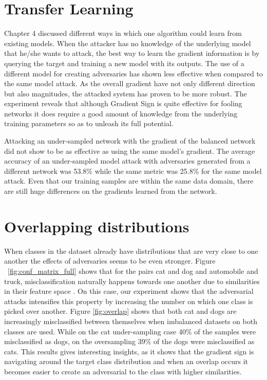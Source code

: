 \section{Transfer Learning}

Chapter 4 discussed different ways in which one algorithm could learn from existing models. When the attacker has no knowledge of the underlying model that he/she wants to attack, the best way to learn the gradient information is by querying the target and training a new model with its outputs. The use of a different model for creating adversaries has shown less effective when compared to the same model attack. As the overall gradient have not only different direction but also magnitudes, the attacked system has proven to be more robust. The experiment reveals that although Gradient Sign is quite effective for fooling networks it does require a good amount of knowledge from the underlying training parameters so as to unleash its full potential.

Attacking an under-sampled network with the gradient of the balanced network did not show to be as effective as using the same model's gradient. The average accuracy of an under-sampled model attack with adversaries generated from a different network was 53.8\% while the same metric was 25.8\% for the same model attack. Even that our training samples are within the same data domain, there are still huge differences on the gradients learned from the network. 

\section{Overlapping distributions}
When classes in the dataset already have distributions that are very close to one another the effects of adversaries seems to be even stronger. Figure ~\ref{fig:conf_matrix_full} shows that for the pairs cat and dog and automobile and truck, misclassification naturally happens towards one another due to similarities in their feature space \cite{stanford2016}. On this case, our experiment shows that the adversarial attacks intensifies this property by increasing the number on which one class is picked over another. Figure \ref{fig:overlap} shows that both cat and dogs are increasingly misclassified between themselves when imbalanced datasets on both classes are used. While on the cat under-sampling case 40\% of the samples were misclassified as dogs, on the oversampling 39\% of the dogs were misclassified as cats. This results gives interesting insights, as it shows that the gradient sign is navigating around the target class distribution and when an overlap occurs it becomes easier to create an adversarial to the class with higher similarities.


